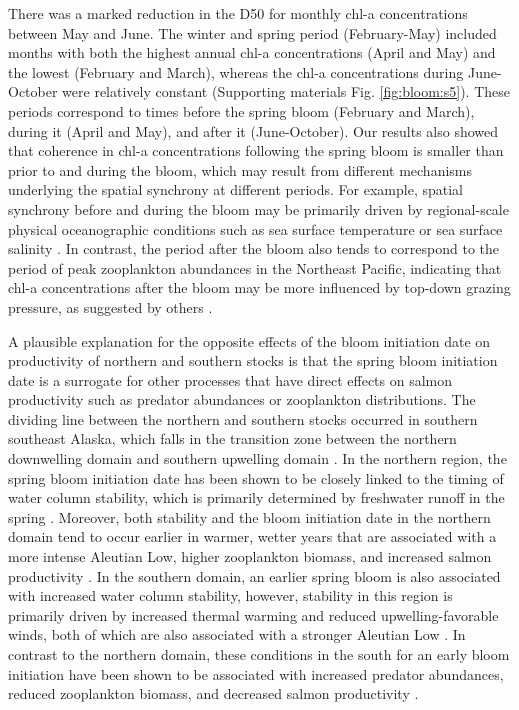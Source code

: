 There was a marked reduction in the D50 for monthly chl-a concentrations between
May and June. The winter and spring period (February-May) included months with
both the highest annual chl-a concentrations (April and May) and the lowest
(February and March), whereas the chl-a concentrations during June-October were
relatively constant (Supporting materials Fig. \ref{fig:bloom:s5}). These
periods correspond to times before the spring bloom (February and March), during
it (April and May), and after it (June-October). Our results also showed that
coherence in chl-a concentrations following the spring bloom is smaller than
prior to and during the bloom, which may result from different mechanisms
underlying the spatial synchrony at different periods. For example, spatial
synchrony before and during the bloom may be primarily driven by regional-scale
physical oceanographic conditions such as sea surface temperature or sea surface
salinity \citep{Henson2007a}. In contrast, the period after the bloom also tends
to correspond to the period of peak zooplankton abundances in the Northeast
Pacific, indicating that chl-a concentrations after the bloom may be more
influenced by top-down grazing pressure, as suggested by others
\citep{Chittenden2010a, Bornhold2000, Mackas2012}.

A plausible explanation for the opposite effects of the bloom initiation date on
productivity of northern and southern stocks is that the spring bloom initiation
date is a surrogate for other processes that have direct effects on salmon
productivity such as predator abundances or zooplankton distributions. The
dividing line between the northern and southern stocks occurred in southern
southeast Alaska, which falls in the transition zone between the northern
downwelling domain and southern upwelling domain \citep{Ware1989a}. In the
northern region, the spring bloom initiation date has been shown to be closely
linked to the timing of water column stability, which is primarily determined by
freshwater runoff in the spring \citep{Weingartner2005a, Henson2007a}. Moreover,
both stability and the bloom initiation date in the northern domain tend to
occur earlier in warmer, wetter years that are associated with a more intense
Aleutian Low, higher zooplankton biomass, and increased salmon productivity
\citep{Brodeur1992a, Mueter2002a}. In the southern domain, an earlier spring
bloom is also associated with increased water column stability, however,
stability in this region is primarily driven by increased thermal warming and
reduced upwelling-favorable winds, both of which are also associated with a
stronger Aleutian Low \citep{Polovina1995a, Henson2007a}. In contrast to the
northern domain, these conditions in the south for an early bloom initiation
have been shown to be associated with increased predator abundances, reduced
zooplankton biomass, and decreased salmon productivity \citep{Ware1995a,
Mackas2001a, Mueter2002a}.

